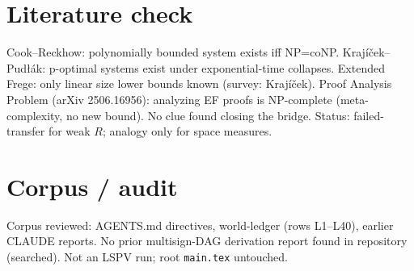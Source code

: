 \documentclass[11pt]{article}
\begin{document}
\section{Literature check}
Cook--Reckhow: polynomially bounded system exists iff NP=coNP. Kraj\'i\v{c}ek--Pud\l\'ak: p-optimal systems exist under exponential-time collapses. Extended Frege: only linear size lower bounds known (survey: Kraj\'i\v{c}ek). Proof Analysis Problem (arXiv 2506.16956): analyzing EF proofs is NP-complete (meta-complexity, no new bound). No clue found closing the bridge. Status: failed-transfer for weak $R$; analogy only for space measures.

\section{Corpus / audit}
Corpus reviewed: AGENTS.md directives, world-ledger (rows L1--L40), earlier CLAUDE reports. No prior multisign-DAG derivation report found in repository (searched). Not an LSPV run; root \texttt{main.tex} untouched.

\end{document}
